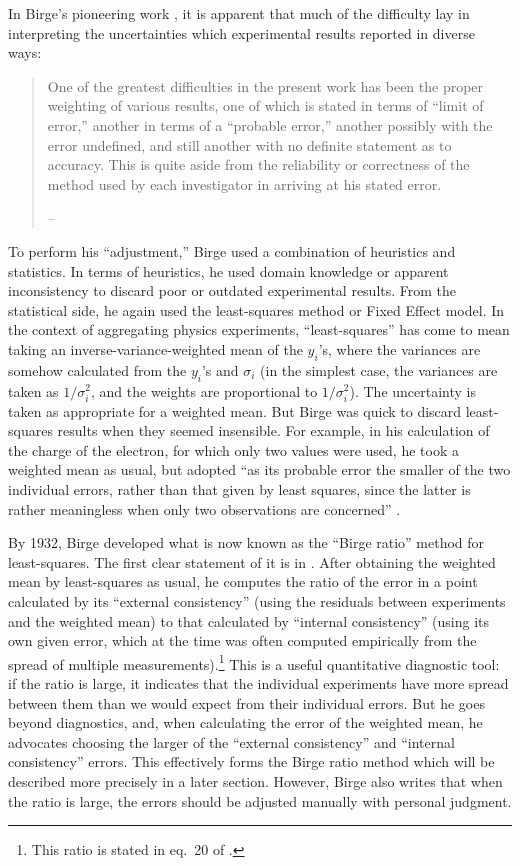 \documentclass[letterpaper,12pt]{article}
\begin{document}
In Birge's pioneering work \citeyearpar{birge1929probable}, it is apparent that much of the difficulty lay in interpreting the uncertainties which experimental results reported in diverse ways:
\begin{quote}
  One of the greatest difficulties in the present work has been the proper weighting of various results, one of which is stated in terms of ``limit of error,'' another in terms of a ``probable error,'' another possibly with the error undefined, and still another with no definite statement as to accuracy. This is quite aside from the reliability or correctness of the method used by each investigator in arriving at his stated error.

  \hfill -- \cite{birge1929probable}
\end{quote} 

To perform his ``adjustment,'' Birge used a combination of heuristics and statistics. In terms of heuristics, he used domain knowledge or apparent inconsistency to discard poor or outdated experimental results. From the statistical side, he again used the least-squares method or Fixed Effect model. In the context of aggregating physics experiments, ``least-squares'' has come to mean taking an inverse-variance-weighted mean of the $y_i$'s, where the variances are somehow calculated from the $y_i$'s and $\sigma_i$ (in the simplest case, the variances are taken as $1/\sigma_i^2$, and the weights are proportional to $1/\sigma_i^2$). The uncertainty is taken as appropriate for a weighted mean. But Birge was quick to discard least-squares results when they seemed insensible. For example, in his calculation of the charge of the electron, for which only two values were used, he took a weighted mean as usual, but adopted ``as its probable error the smaller of the two individual errors, rather than that given by least squares, since the latter is rather meaningless when only two observations are concerned'' \citep{birge1929probable}.

By 1932, Birge developed what is now known as the ``Birge ratio'' method for least-squares. The first clear statement of it is in \cite{birge1932calculation}. After obtaining the weighted mean by least-squares as usual, he computes the ratio of the error in a point calculated by its ``external consistency'' (using the residuals between experiments and the weighted mean) to that calculated by ``internal consistency'' (using its own given error, which at the time was often computed empirically from the spread of multiple measurements).\footnote{This ratio is stated in eq.~20 of \citet{birge1932calculation}.} This is a useful quantitative diagnostic tool: if the ratio is large, it indicates that the individual experiments have more spread between them than we would expect from their individual errors. But he goes beyond diagnostics, and, when calculating the error of the weighted mean, he advocates choosing the larger of the ``external consistency'' and ``internal consistency'' errors. This effectively forms the Birge ratio method which will be described more precisely in a later section. However, Birge also writes that when the ratio is large, the errors should be adjusted manually with personal judgment.
\end{document}

